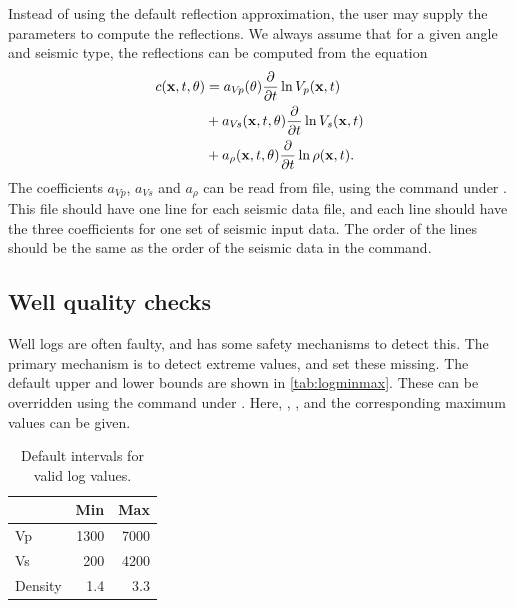 {Instead of using the default reflection approximation, the user may
supply the parameters to compute the reflections. We always assume
that for a given angle and seismic type, the reflections can be
computed from the equation 
\begin{equation}
\begin{split}
  c(\mathbf{x},t,\theta)
  & = a_{V\!p} (\theta) \frac{\partial}{\partial t}\ln V_p (\mathbf{x},t)\\
  & + a_{V\!s} (\mathbf{x},t,\theta) \frac{\partial}{\partial t}\ln V_s (\mathbf{x},t)\\
  & + a_\rho(\mathbf{x},t,\theta) \frac{\partial}{\partial t}\ln\rho(\mathbf{x},t).
\label{eq:linrefl}
\end{split}
\end{equation}
The coefficients $a_{V\!p}$, $a_{V\!s}$ and $a_\rho$ can be read from
file, using the 
command under . This file should have one line
for each seismic data file, and each line should have the three
coefficients for one set of seismic input data. The order of the lines
should be the same as the order of the seismic data in the 
command. 

\subsection{Well quality checks}
Well logs are often faulty, and \crava has some safety mechanisms to
detect this. The primary mechanism is to detect extreme values, and
set these missing. The default upper and lower bounds are shown in
\autoref{tab:logminmax}. These can be overridden using the command
 under
. Here, , ,
 and the corresponding maximum values can be
given. 
\begin{table}
\begin{tabular}{|lrr|}
\hline
& Min & Max \\
\hline
Vp & 1300 & 7000 \\
Vs &  200 & 4200 \\
Density & 1.4 & 3.3
\end{tabular}
\caption{Default intervals for valid log values.\label{tab:logminmax}}
\end{table}


}
